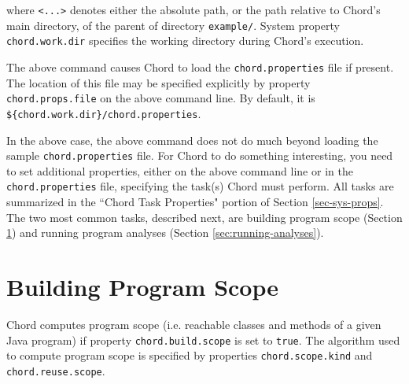 \documentclass{article}
\begin{document}
where \verb+<...>+ denotes either the absolute path, or the path relative to Chord's main directory,
of the parent of directory {\tt example/}.
System property \verb+chord.work.dir+ specifies the working directory during Chord's execution.

The above command causes Chord to load the \verb+chord.properties+ file if present.
The location of this file may be specified explicitly by property
\verb+chord.props.file+ on the above command line.
By default, it is \verb+${chord.work.dir}/chord.properties+.

In the above case, the above command does not do much beyond loading the sample \verb+chord.properties+ file.
For Chord to do something interesting, you need to set additional properties, either
on the above command line or in the \verb+chord.properties+ file, specifying the task(s)
Chord must perform.
All tasks are summarized in the ``Chord Task Properties" portion of Section \ref{sec-sys-props}.
The two most common tasks, described next, are building program scope (Section \ref{sec:building-scope})
and running program analyses (Section \ref{sec:running-analyses}).

\texonly{\newpage}
\section{Building Program Scope}
\label{sec:building-scope}

Chord computes program scope (i.e. reachable classes and methods of a given Java program) if property
\verb+chord.build.scope+ is set to \verb+true+.
The algorithm used to compute program scope is specified by 
properties \verb+chord.scope.kind+ and \verb+chord.reuse.scope+.
\end{document}
